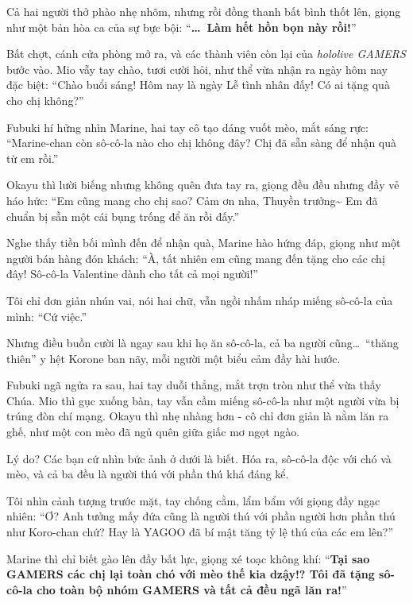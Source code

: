 \documentclass[../main.tex]{subfiles}
\begin{document}
Cả hai người thở phào nhẹ nhõm, nhưng rồi đồng thanh bất bình thốt lên, giọng như một bản hòa ca của sự bực bội: ``\textbf{\dots\ Làm hết hồn bọn này rồi!}''

Bất chợt, cánh cửa phòng mở ra, và các thành viên còn lại của \textit{hololive GAMERS} bước vào. Mio vẫy tay chào, tươi cười hỏi, như thể vừa nhận ra ngày hôm nay đặc biệt: ``Chào buổi sáng! Hôm nay là ngày Lễ tình nhân đấy! Có ai tặng quà cho chị không?''

Fubuki hí hửng nhìn Marine, hai tay cô tạo dáng vuốt mèo, mắt sáng rực: ``Marine-chan còn sô-cô-la nào cho chị không đây? Chị đã sẵn sàng để nhận quà từ em rồi.''

Okayu thì lười biếng nhưng không quên đưa tay ra, giọng đều đều nhưng đầy vẻ háo hức: ``Em cũng mang cho chị sao? Cảm ơn nha, Thuyền trưởng\~{} Em đã chuẩn bị sẵn một cái bụng trống để ăn rồi đấy.''

Nghe thấy tiền bối mình đến để nhận quà, Marine hào hứng đáp, giọng như một người bán hàng đón khách: ``À, tất nhiên em cũng mang đến tặng cho các chị đây! Sô-cô-la Valentine dành cho tất cả mọi người!''


Tôi chỉ đơn giản nhún vai, nói hai chữ, vẫn ngồi nhấm nháp miếng sô-cô-la của mình: ``Cứ việc.''

Nhưng điều buồn cười là ngay sau khi họ ăn sô-cô-la, cả ba người cũng\dots\ ``thăng thiên'' y hệt Korone ban nãy, mỗi người một biểu cảm đầy hài hước.

Fubuki ngã ngửa ra sau, hai tay duỗi thẳng, mắt trợn tròn như thể vừa thấy Chúa. Mio thì gục xuống bàn, tay vẫn cầm miếng sô-cô-la như một người vừa bị trúng đòn chí mạng. Okayu thì nhẹ nhàng hơn - cô chỉ đơn giản là nằm lăn ra ghế, như một con mèo đã ngủ quên giữa giấc mơ ngọt ngào.

Lý do? Các bạn cứ nhìn bức ảnh ở dưới là biết. Hóa ra, sô-cô-la độc với chó và mèo, và cả ba đều là người thú với phần thú khá đáng kể.


Tôi nhìn cảnh tượng trước mặt, tay chống cằm, lẩm bẩm với giọng đầy ngạc nhiên: ``Ơ? Anh tưởng mấy đứa cũng là người thú với phần người hơn phần thú như Koro-chan chứ? Hay là YAGOO đã bí mật tăng tỷ lệ thú của các em lên?''

Marine thì chỉ biết gào lên đầy bất lực, giọng xé toạc không khí: ``\textbf{Tại sao GAMERS các chị lại toàn chó với mèo thế kia dzậy!? Tôi đã tặng sô-cô-la cho toàn bộ nhóm GAMERS và tất cả đều ngã lăn ra!}''
\end{document}
